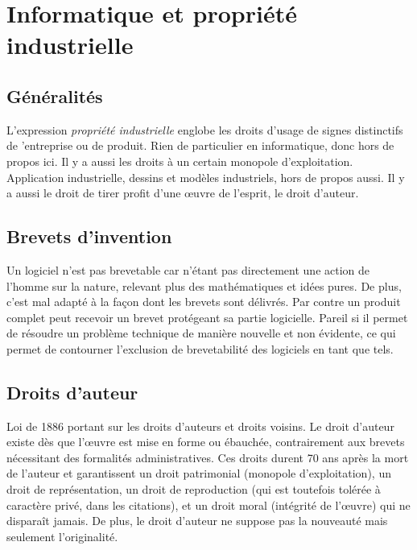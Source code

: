 \documentclass[fleqn,letterpaper, 12pt]{article}
\begin{document}
	
	
	\section{Informatique et propriété industrielle}
	\subsection{Généralités}
	
	L'expression \emph{propriété industrielle} englobe les droits d'usage de signes distinctifs de 'entreprise ou de produit. Rien de particulier en informatique, donc hors de propos ici. Il y a aussi les droits à un certain monopole d'exploitation. Application industrielle, dessins et modèles industriels, hors de propos aussi. Il y a aussi le droit de tirer profit d'une \oe uvre de l'esprit, le droit d'auteur.
	
	
	\subsection{Brevets d'invention}
	
	Un logiciel n'est pas brevetable car n'étant pas directement une action de l'homme sur la nature, relevant plus des mathématiques et idées pures. De plus, c'est mal adapté à la façon dont les brevets sont délivrés. Par contre un produit complet peut recevoir un brevet protégeant sa partie logicielle. Pareil si il permet de résoudre un problème technique de manière nouvelle et non évidente, ce qui permet de contourner l'exclusion de brevetabilité des logiciels en tant que tels.
	
	
	
	\subsection{Droits d'auteur}
	
	Loi de 1886 portant sur les droits d'auteurs et droits voisins. Le droit d'auteur existe dès que l'\oe uvre est mise en forme ou ébauchée, contrairement aux brevets nécessitant des formalités administratives. Ces droits durent 70 ans après la mort de l'auteur et garantissent un droit patrimonial (monopole d'exploitation), un droit de représentation, un droit de reproduction (qui est toutefois tolérée à caractère privé, dans les citations), et un droit moral (intégrité de l'\oe uvre) qui ne disparaît jamais. De plus, le droit d'auteur ne suppose pas la nouveauté mais seulement l'originalité.
	
\end{document}
